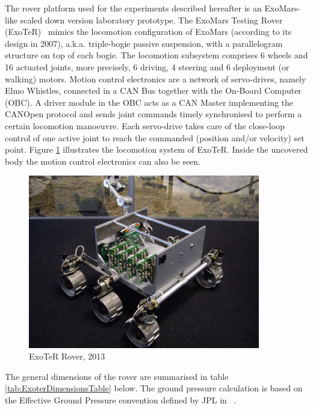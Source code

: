 \documentclass[a4paper,twocolumn]{esapub2005} %
\begin{document}
The rover platform used for the experiments described hereafter is an
ExoMars-like scaled down version laboratory prototype. The ExoMars Testing
Rover (ExoTeR)~\cite{Azkarate2015} mimics the locomotion configuration of
ExoMars (according to its design in 2007), a.k.a. triple-bogie passive
suspension, with a parallelogram structure on top of each bogie. The locomotion
subsystem comprises 6 wheels and 16 actuated joints, more precisely, 6 driving,
4 steering and 6 deployment (or walking) motors.  Motion control electronics
are a network of servo-drives, namely Elmo Whistles, connected in a CAN Bus
together with the On-Board Computer (OBC). A driver module in the OBC acts as a CAN
Master implementing the CANOpen protocol and sends joint commands timely
synchronised to perform a certain locomotion manoeuvre. Each servo-drive takes
care of the close-loop control of one active joint to reach the commanded
(position and/or velocity) set point.  Figure \ref{fig:ExoterRover2013} illustrates the locomotion
system of ExoTeR. Inside the uncovered body the motion control electronics can
also be seen.

\begin{figure}[h!]
    \centering
    \includegraphics[width=0.9\textwidth]{ExoterRover2013.jpg}
    \caption{ExoTeR Rover, 2013}
    \label{fig:ExoterRover2013}
\end{figure}

The general dimensions of the rover are summarised in table \ref{tab:ExoterDimensionsTable} below. The ground pressure calculation is based on the Effective Ground Pressure convention defined by JPL in ~\cite{ROB:ROB21481}.
\end{document}
